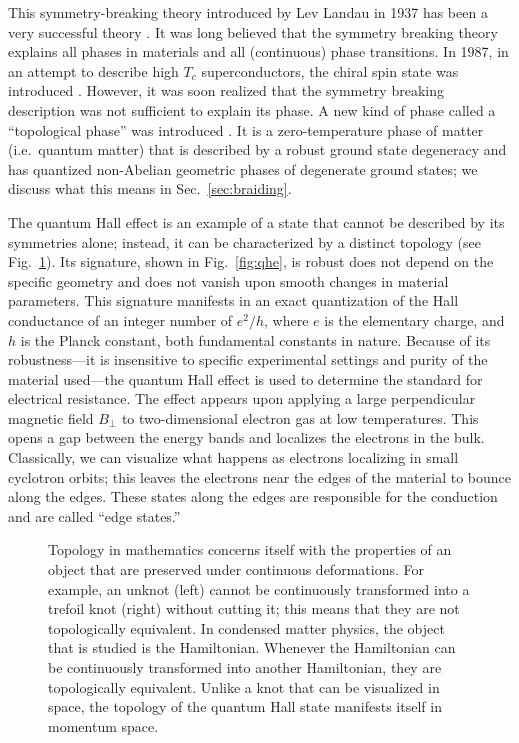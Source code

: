 This symmetry-breaking theory introduced by Lev Landau in 1937 has been a very successful theory \cite{Landau1937}.  %
It was long believed that the symmetry breaking theory explains all phases in materials and all (continuous) phase transitions.
In 1987, in an attempt to describe high $T_c$ superconductors, the chiral spin state was introduced \cite{Kalmeyer1987}.
However, it was soon realized that the symmetry breaking description was not sufficient to explain its phase.
A new kind of phase called a ``topological phase'' was introduced \cite{Wen1989,XiaoGang1990}.
It is a zero-temperature phase of matter (i.e.~quantum matter) that is described by a robust ground state degeneracy and has quantized non-Abelian geometric phases of degenerate ground states; we discuss what this means in Sec.~\ref{sec:braiding}.

The quantum Hall effect is an example of a state that cannot be described by its symmetries alone; instead, it can be characterized by a distinct topology (see Fig.~\ref{fig:knots}).  %
Its signature, shown in Fig.~\ref{fig:qhe}, is robust does not depend on the specific geometry and does not vanish upon smooth changes in material parameters.
This signature manifests in an exact quantization of the Hall conductance of an integer number of $e^2/h$, where $e$ is the elementary charge, and $h$ is the Planck constant, both fundamental constants in nature.
Because of its robustness---it is insensitive to specific experimental settings and purity of the material used---the quantum Hall effect is used to determine the standard for electrical resistance. %
The effect appears upon applying a large perpendicular magnetic field $B_\perp$ to two-dimensional electron gas at low temperatures.
This opens a gap between the energy bands and localizes the electrons in the bulk.
Classically, we can visualize what happens as electrons localizing in small cyclotron orbits; this leaves the electrons near the edges of the material to bounce along the edges.
These states along the edges are responsible for the conduction and are called ``edge states.''

\begin{figure}[!htb]
\begin{center}
\caption{
Topology in mathematics concerns itself with the properties of an object that are preserved under continuous deformations.
For example, an unknot (left) cannot be continuously transformed into a trefoil knot (right) without cutting it; this means that they are not topologically equivalent.
In condensed matter physics, the object that is studied is the Hamiltonian.
Whenever the Hamiltonian can be continuously transformed into another Hamiltonian, they are topologically equivalent.
Unlike a knot that can be visualized in space, the topology of the quantum Hall state manifests itself in momentum space.
\label{fig:knots}}
\end{center}
\end{figure}

